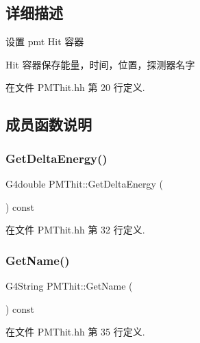 \subsection{详细描述}
设置 pmt Hit 容器 

Hit 容器保存能量，时间，位置，探测器名字 

在文件 P\+M\+Thit.\+hh 第 20 行定义.



\subsection{成员函数说明}
\mbox{\label{classPMThit_ac886469dc7bcc5e8f0d83de79fe636ee}} 
\subsubsection{\texorpdfstring{Get\+Delta\+Energy()}{GetDeltaEnergy()}}
{\footnotesize\ttfamily G4double P\+M\+Thit\+::\+Get\+Delta\+Energy (\begin{DoxyParamCaption}{ }\end{DoxyParamCaption}) const\hspace{0.3cm}{\ttfamily [inline]}}



在文件 P\+M\+Thit.\+hh 第 32 行定义.

\mbox{\label{classPMThit_a497b90707c899f06ca4a1ecfdf537f64}} 
\subsubsection{\texorpdfstring{Get\+Name()}{GetName()}}
{\footnotesize\ttfamily G4\+String P\+M\+Thit\+::\+Get\+Name (\begin{DoxyParamCaption}{ }\end{DoxyParamCaption}) const\hspace{0.3cm}{\ttfamily [inline]}}



在文件 P\+M\+Thit.\+hh 第 35 行定义.

\mbox{\label{classPMThit_ab731ac987db0650157d94673cd5a40be}} 
